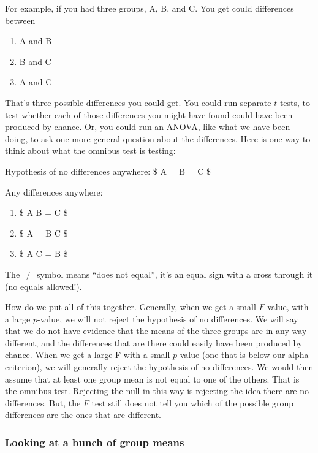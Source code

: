 \documentclass[
]{book}
\providecommand{\tightlist}{%
  \setlength{\itemsep}{0pt}\setlength{\parskip}{0pt}}
\begin{document}
For example, if you had three groups, A, B, and C. You get could differences between

\begin{enumerate}
\def\labelenumi{\arabic{enumi}.}
\tightlist
\item
  A and B
\item
  B and C
\item
  A and C
\end{enumerate}

That's three possible differences you could get. You could run separate \(t\)-tests, to test whether each of those differences you might have found could have been produced by chance. Or, you could run an ANOVA, like what we have been doing, to ask one more general question about the differences. Here is one way to think about what the omnibus test is testing:

Hypothesis of no differences anywhere: \$ A = B = C \$

Any differences anywhere:

\begin{enumerate}
\def\labelenumi{\alph{enumi}.}
\tightlist
\item
  \$ A \neq B = C \$
\item
  \$ A = B \neq C \$
\item
  \$ A \neq C = B \$
\end{enumerate}

The \(\neq\) symbol means ``does not equal'', it's an equal sign with a cross through it (no equals allowed!).

How do we put all of this together. Generally, when we get a small \(F\)-value, with a large \(p\)-value, we will not reject the hypothesis of no differences. We will say that we do not have evidence that the means of the three groups are in any way different, and the differences that are there could easily have been produced by chance. When we get a large F with a small \(p\)-value (one that is below our alpha criterion), we will generally reject the hypothesis of no differences. We would then assume that at least one group mean is not equal to one of the others. That is the omnibus test. Rejecting the null in this way is rejecting the idea there are no differences. But, the \(F\) test still does not tell you which of the possible group differences are the ones that are different.

\hypertarget{looking-at-a-bunch-of-group-means}{%
\subsubsection{Looking at a bunch of group means}\label{looking-at-a-bunch-of-group-means}}
\end{document}
